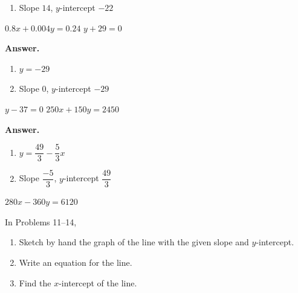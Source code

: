 \documentclass[10pt,]{book}
\theoremstyle{plain}
\theoremstyle{definition}
\theoremstyle{definition}
\theoremstyle{definition}
\theoremstyle{definition}
\numberwithin{equation}{part}
\begin{document}
\begin{exercisegroup}
\begin{multicols}{2}
\begin{enumerate}[label=*\alph**]
\item\hypertarget{li-1154}{}Slope \(14\), \(y\)-intercept \(-22 \)%
\end{enumerate}
\end{multicols}
%
\exercise[6.]\hypertarget{exercise-292}{}\(0.8x + 0.004y = 0.24\)%
\exercise[7.]\hypertarget{exercise-293}{}\(y + 29 = 0\)%
\par\smallskip
\noindent\textbf{Answer.}\hypertarget{answer-167}{}\quad
\leavevmode%
\begin{multicols}{2}
\begin{enumerate}[label=*\alph**]
\item\hypertarget{li-1155}{}\(y = -29\)%
\item\hypertarget{li-1156}{}Slope \(0\), \(y\)-intercept \(-29 \)%
\end{enumerate}
\end{multicols}
%
\exercise[8.]\hypertarget{exercise-294}{}\(y - 37 = 0\)%
\exercise[9.]\hypertarget{exercise-295}{}\(250x + 150y = 2450\)%
\par\smallskip
\noindent\textbf{Answer.}\hypertarget{answer-168}{}\quad
\leavevmode%
\begin{multicols}{2}
\begin{enumerate}[label=*\alph**]
\item\hypertarget{li-1157}{}\(y =\dfrac{49}{3}-\dfrac{5}{3}x \)%
\item\hypertarget{li-1158}{}Slope \(\dfrac{-5}{3}\), \(y\)-intercept \(\dfrac{49}{3} \)%
\end{enumerate}
\end{multicols}
%
\exercise[10.]\hypertarget{exercise-296}{}\(280x - 360y = 6120\)%
\end{exercisegroup}
\par\smallskip\noindent
\hypertarget{exercisegroup-37}{}\par\noindent In Problems 11–14, \leavevmode%
\begin{enumerate}[label=*\alph**]
\item\hypertarget{li-1159}{}Sketch by hand the graph of the line with the given slope and \(y\)-intercept.%
\item\hypertarget{li-1160}{}Write an equation for the line.%
\item\hypertarget{li-1161}{}Find the \(x\)-intercept of the line.%
\end{enumerate}
%
\end{document}
